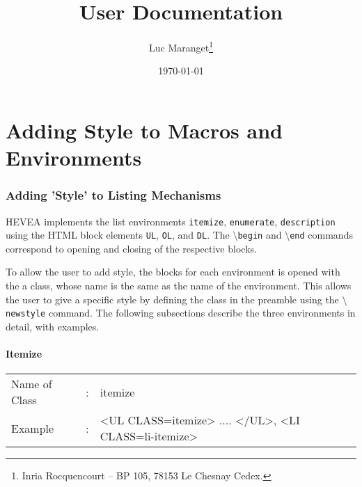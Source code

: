 \documentclass {article}
\title{\hevea{} User Documentation}
\author{Luc Maranget\thanks{Inria Rocquencourt -- BP 105, 78153 Le
Chesnay Cedex. {\tt \mailto{Luc.Maranget@inria.fr}}}}
\date{\today}
\begin{document}
\maketitle

\part{Adding Style to Macros and Environments}

\section {Adding 'Style' to Listing Mechanisms}
HEVEA implements the list environments \texttt{itemize}, \texttt{enumerate}, \texttt{description} using the HTML block elements \texttt{UL}, \texttt{OL}, and \texttt{DL}. The \texttt{$\setminus$begin} and \texttt{$\setminus$end} commands correspond to opening and closing of the respective blocks. 

To allow the user to add style, the blocks for each environment is opened with the a class, whose name is the same as the name of the environment. This allows the user to give a specific style by defining the class in the preamble using the \texttt{$\setminus$newstyle} command. The following subsections describe the three environments in detail, with examples. 

\subsection{Itemize}
\begin{tabular}{lll}
Name of Class & : & itemize\\
Example & : & <UL CLASS=itemize> .... </UL>, <LI CLASS=li-itemize>\\
\end{tabular}
\end{document}
